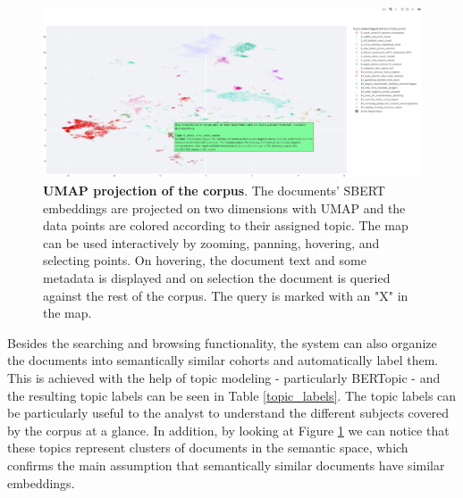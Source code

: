\documentclass[a4paper]{article}
\begin{document}
\begin{figure}[H]
  \centering
  \includegraphics[scale=0.325]{./assets/map_screenshot}
  \caption{\textbf{UMAP projection of the corpus}. The documents' SBERT embeddings are projected on two dimensions with UMAP and the data points are colored according to their assigned topic. The map can be used interactively by zooming, panning, hovering, and selecting points. On hovering, the document text and some metadata is displayed and on selection the document is queried against the rest of the corpus. The query is marked with an "X" in the map.}
  \label{app_map}
\end{figure}

Besides the searching and browsing functionality, the system can also organize the documents into semantically similar cohorts and automatically label them. This is achieved with the help of topic modeling - particularly BERTopic - and the resulting topic labels can be seen in Table \ref{topic_labels}. The topic labels can be particularly useful to the analyst to understand the different subjects covered by the corpus at a glance. In addition, by looking at Figure \ref{app_map} we can notice that these topics represent clusters of documents in the semantic space, which confirms the main assumption that semantically similar documents have similar embeddings. 
\end{document}
